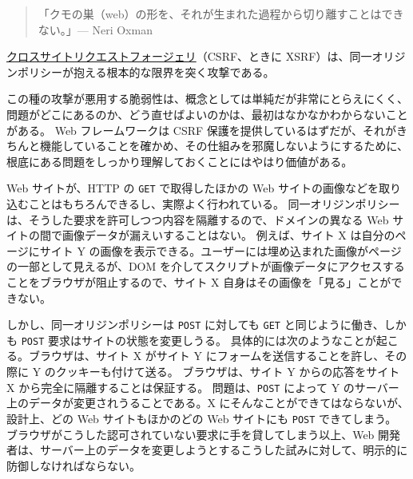 \documentclass[uplatex]{jsarticle}
\def\label#1{}%
\begin{document}
\begin{quote}
「クモの巣（web）の形を、それが生まれた過程から切り離すことはできない。」\hfill --- Neri Oxman
\end{quote}

\begin{dfn}[クロスサイトリクエストフォージェリ]\label{dfn:ch11-csrf}
\underline{クロスサイトリクエストフォージェリ}（CSRF、ときに XSRF）は、同一オリジンポリシーが抱える根本的な限界を突く攻撃である。
\end{dfn}

この種の攻撃が悪用する脆弱性は、概念としては単純だが非常にとらえにくく、問題がどこにあるのか、どう直せばよいのかは、最初はなかなかわからないことがある。
Web フレームワークは CSRF 保護を提供しているはずだが、それがきちんと機能していることを確かめ、その仕組みを邪魔しないようにするために、根底にある問題をしっかり理解しておくことにはやはり価値がある。

Web サイトが、HTTP の \texttt{GET} で取得したほかの Web サイトの画像などを取り込むことはもちろんできるし、実際よく行われている。
同一オリジンポリシーは、そうした要求を許可しつつ内容を隔離するので、ドメインの異なる Web サイトの間で画像データが漏えいすることはない。
例えば、サイト X は自分のページにサイト Y の画像を表示できる。ユーザーには埋め込まれた画像がページの一部として見えるが、DOM を介してスクリプトが画像データにアクセスすることをブラウザが阻止するので、サイト X 自身はその画像を「見る」ことができない。

しかし、同一オリジンポリシーは \texttt{POST} に対しても \texttt{GET} と同じように働き、しかも \texttt{POST} 要求はサイトの状態を変更しうる。
具体的には次のようなことが起こる。ブラウザは、サイト X がサイト Y にフォームを送信することを許し、その際に Y のクッキーも付けて送る。
ブラウザは、サイト Y からの応答をサイト X から完全に隔離することは保証する。
問題は、\texttt{POST} によって Y のサーバー上のデータが変更されうることである。X にそんなことができてはならないが、設計上、どの Web サイトもほかのどの Web サイトにも \texttt{POST} できてしまう。
ブラウザがこうした認可されていない要求に手を貸してしまう以上、Web 開発者は、サーバー上のデータを変更しようとするこうした試みに対して、明示的に防御しなければならない。
\end{document}
